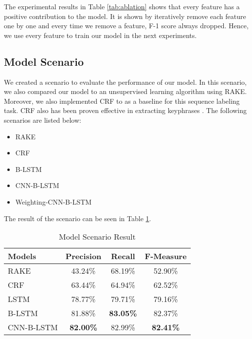 The experimental results in Table \ref{tab:ablation} shows that every feature has a positive contribution to the model. It is shown by iteratively remove each feature one by one and every time we remove a feature, F-1 score always dropped. Hence, we use every feature to train our model in the next experiments.
\subsection{Model Scenario}
We created a scenario to evaluate the performance of our model. In this scenario, we also compared our model to an unsupervised learning algorithm using RAKE. Moreover, we also implemented CRF to as a baseline for this sequence labeling task. CRF also has been proven effective in extracting keyphrases \cite{cao2010automatically} \cite{zhang2008automatic}. The following scenarios are listed below:
\begin{itemize}
	\item RAKE
	\item CRF
	\item B-LSTM
	\item CNN-B-LSTM
	\item Weighting-CNN-B-LSTM
\end{itemize}
The result of the scenario can be seen in Table \ref{tab:model_scenario}.
\begin{table}
	\caption{Model Scenario Result}
	\label{tab:model_scenario}
	\begin{tabular}{lccc}
		\toprule
		Models&Precision&Recall&F-Measure\\
		\midrule
		RAKE & 43.24\% & 68.19\% & 52.90\% \\
		
		CRF & 63.44\% & 64.94\% & 62.52\% \\
		
		LSTM & 78.77\% & 79.71\% & 79.16\% \\
		
		B-LSTM & 81.88\% & \textbf{83.05\%} & 82.37\% \\
		
		CNN-B-LSTM & \textbf{82.00\%} & 82.99\% & \textbf{82.41\%} \\
		
		\bottomrule
	\end{tabular}
\end{table}
